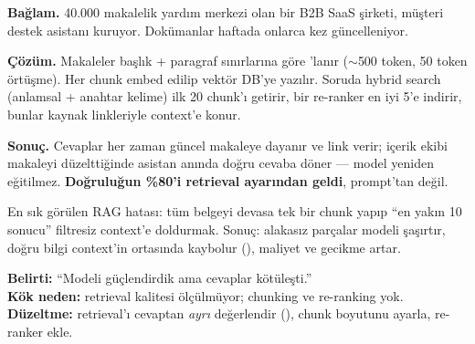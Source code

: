 
\begin{prodbox}
\textbf{Bağlam.} 40.000 makalelik yardım merkezi olan bir B2B SaaS şirketi,
müşteri destek asistanı kuruyor. Dokümanlar haftada onlarca kez güncelleniyor.

\smallskip
\textbf{Çözüm.} Makaleler başlık + paragraf sınırlarına göre 'lanır
(\(\sim\)500 token, 50 token örtüşme). Her chunk embed edilip vektör DB'ye yazılır.
Soruda hybrid search (anlamsal + anahtar kelime) ilk 20 chunk'ı getirir,
bir re-ranker en iyi 5'e indirir, bunlar kaynak linkleriyle context'e konur.

\smallskip
\textbf{Sonuç.} Cevaplar her zaman güncel makaleye dayanır ve link verir; içerik
ekibi makaleyi düzelttiğinde asistan anında doğru cevaba döner --- model
yeniden eğitilmez. \textbf{Doğruluğun \%80'i retrieval ayarından geldi}, prompt'tan değil.
\end{prodbox}

\begin{antibox}
En sık görülen RAG hatası: tüm belgeyi devasa tek bir chunk yapıp ``en yakın 10
sonucu'' filtresiz context'e doldurmak. Sonuç: alakasız parçalar modeli
şaşırtır, doğru bilgi context'in ortasında kaybolur (),
maliyet ve gecikme artar.

\smallskip
\textbf{Belirti:} ``Modeli güçlendirdik ama cevaplar kötüleşti.''\\
\textbf{Kök neden:} retrieval kalitesi ölçülmüyor; chunking ve re-ranking yok.\\
\textbf{Düzeltme:} retrieval'ı cevaptan \emph{ayrı} değerlendir (), chunk boyutunu ayarla, re-ranker ekle.
\end{antibox}

